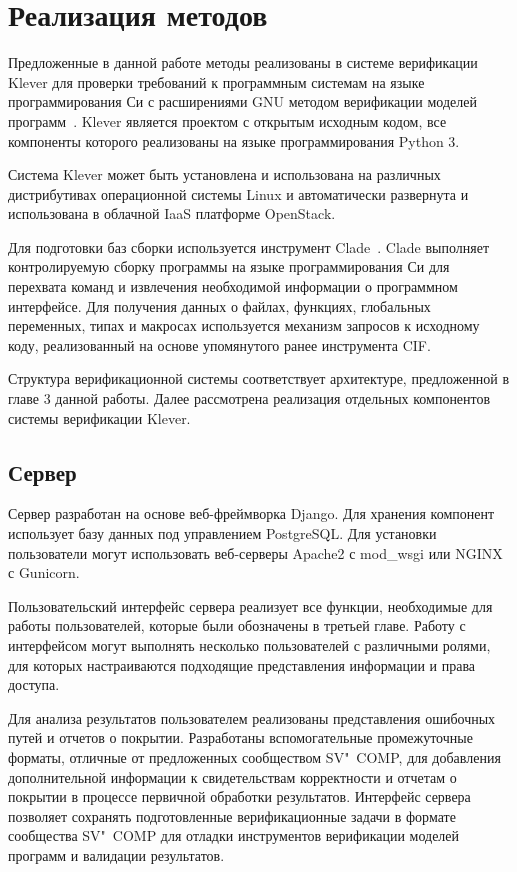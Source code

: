 \chapter{Реализация методов}
Предложенные в данной работе методы реализованы в системе верификации Klever для проверки требований к программным системам на языке программирования Си с расширениями GNU методом верификации моделей программ~\cite{klever}.
Klever является проектом с открытым исходным кодом, все компоненты которого реализованы на языке программирования Python 3.

Система Klever может быть установлена и использована на различных дистрибутивах операционной системы Linux и автоматически развернута и использована в облачной IaaS платформе OpenStack.

Для подготовки баз сборки используется инструмент Clade~\cite{clade}.
Clade выполняет контролируемую сборку программы на языке программирования Си для перехвата команд и извлечения необходимой информации о программном интерфейсе.
Для получения данных о файлах, функциях, глобальных переменных, типах и макросах используется механизм запросов к исходному коду, реализованный на основе упомянутого ранее инструмента CIF.

Структура верификационной системы соответствует архитектуре, предложенной в главе 3 данной работы.
Далее рассмотрена реализация отдельных компонентов системы верификации Klever.

\section{Сервер}
Сервер разработан на основе веб-фреймворка Django.
Для хранения компонент использует базу данных под управлением PostgreSQL.
Для установки пользователи могут использовать веб-серверы Apache2 с mod\_wsgi или NGINX с Gunicorn.

Пользовательский интерфейс сервера реализует все функции, необходимые для работы пользователей, которые были обозначены в третьей главе.
Работу с интерфейсом могут выполнять несколько пользователей с различными ролями, для которых настраиваются подходящие представления информации и права доступа.

Для анализа результатов пользователем реализованы представления ошибочных путей и отчетов о покрытии.
Разработаны вспомогательные промежуточные форматы, отличные от предложенных сообществом SV"~COMP, для добавления дополнительной информации к свидетельствам корректности и отчетам о покрытии в процессе первичной обработки результатов.
Интерфейс сервера позволяет сохранять подготовленные верификационные задачи в формате сообщества SV"~COMP для отладки инструментов верификации моделей программ и валидации результатов.

